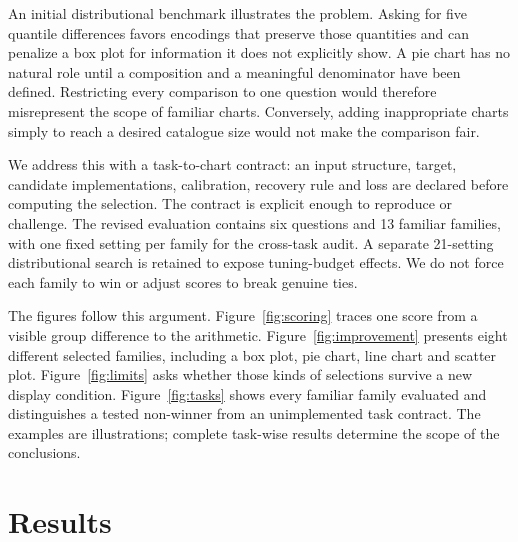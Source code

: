 \documentclass[11pt]{article}
\begin{document}
An initial distributional benchmark illustrates the problem. Asking for five quantile differences favors encodings that preserve those quantities and can penalize a box plot for information it does not explicitly show. A pie chart has no natural role until a composition and a meaningful denominator have been defined. Restricting every comparison to one question would therefore misrepresent the scope of familiar charts. Conversely, adding inappropriate charts simply to reach a desired catalogue size would not make the comparison fair.

We address this with a task-to-chart contract: an input structure, target, candidate implementations, calibration, recovery rule and loss are declared before computing the selection. The contract is explicit enough to reproduce or challenge. The revised evaluation contains six questions and 13 familiar families, with one fixed setting per family for the cross-task audit. A separate 21-setting distributional search is retained to expose tuning-budget effects. We do not force each family to win or adjust scores to break genuine ties.

The figures follow this argument. Figure~\ref{fig:scoring} traces one score from a visible group difference to the arithmetic. Figure~\ref{fig:improvement} presents eight different selected families, including a box plot, pie chart, line chart and scatter plot. Figure~\ref{fig:limits} asks whether those kinds of selections survive a new display condition. Figure~\ref{fig:tasks} shows every familiar family evaluated and distinguishes a tested non-winner from an unimplemented task contract. The examples are illustrations; complete task-wise results determine the scope of the conclusions.

\section*{Results}
\end{document}

